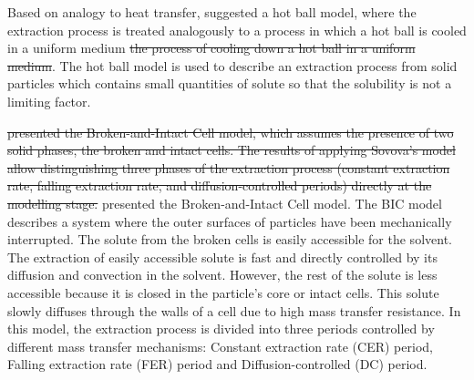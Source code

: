 \documentclass[a4paper,fleqn]{cas-dc}
\begin{document}
Based on analogy to heat transfer, \citet{Reverchon1993} suggested a hot ball model, where the extraction process is treated analogously to {\color{blue} a process in which a hot ball is cooled in a uniform medium} \sout{the process of cooling down a hot ball in a uniform medium}. {\color{blue}The hot ball model is used to describe an extraction process from solid particles which contains small quantities of solute so that the solubility is not a limiting factor. }

\citet{Sovova1994} \sout{presented the Broken-and-Intact Cell model, which assumes the presence of two solid phases, the broken and intact cells. The results of applying Sovova's model allow distinguishing three phases of the extraction process (constant extraction rate, falling extraction rate, and diffusion-controlled periods) directly at the modelling stage.}
{\color{blue} presented the Broken-and-Intact Cell model. The BIC model describes a system where the outer surfaces of particles have been mechanically interrupted. The solute from the broken cells is easily accessible for the solvent. The extraction of easily accessible solute is fast and directly controlled by its diffusion and convection in the solvent.
However, the rest of the solute is less accessible because it is closed in the particle's core or intact cells. This solute slowly diffuses through the walls of a cell due to high mass transfer resistance.
In this model, the extraction process is divided into three periods controlled by different mass transfer mechanisms: Constant extraction rate (CER) period, Falling extraction rate (FER) period and Diffusion-controlled (DC) period.}
\end{document}
